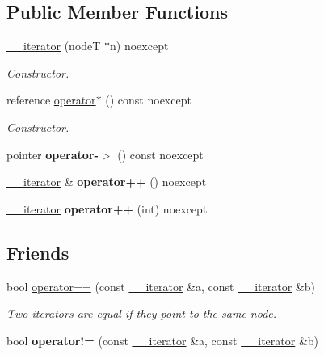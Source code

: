 \subsection*{Public Member Functions}
\begin{DoxyCompactItemize}
\item 
\hyperlink{class_a_putils_1_1____iterator_a80b798b8b6922e66337873c614c32aeb}{\+\_\+\+\_\+iterator} (nodeT $\ast$n) noexcept
\begin{DoxyCompactList}\small\item\em Constructor. \end{DoxyCompactList}\item 
reference \hyperlink{class_a_putils_1_1____iterator_a938d91cde92652266ae812ce9334b603}{operator$\ast$} () const noexcept
\begin{DoxyCompactList}\small\item\em Constructor. \end{DoxyCompactList}\item 
\mbox{\label{class_a_putils_1_1____iterator_a500d853bed90e2ad2db45c785558902c}} 
pointer {\bfseries operator-\/$>$} () const noexcept
\item 
\mbox{\label{class_a_putils_1_1____iterator_a4ef645ac13ab5ce5081462a4de4757e3}} 
\hyperlink{class_a_putils_1_1____iterator}{\+\_\+\+\_\+iterator} \& {\bfseries operator++} () noexcept
\item 
\mbox{\label{class_a_putils_1_1____iterator_aa20ee3ddb367bf371bf2bfb40de5e5f2}} 
\hyperlink{class_a_putils_1_1____iterator}{\+\_\+\+\_\+iterator} {\bfseries operator++} (int) noexcept
\end{DoxyCompactItemize}
\subsection*{Friends}
\begin{DoxyCompactItemize}
\item 
\mbox{\label{class_a_putils_1_1____iterator_a2e5014cb825532053115734598e16318}} 
bool \hyperlink{class_a_putils_1_1____iterator_a2e5014cb825532053115734598e16318}{operator==} (const \hyperlink{class_a_putils_1_1____iterator}{\+\_\+\+\_\+iterator} \&a, const \hyperlink{class_a_putils_1_1____iterator}{\+\_\+\+\_\+iterator} \&b)
\begin{DoxyCompactList}\small\item\em Two iterators are equal if they point to the same node. \end{DoxyCompactList}\item 
\mbox{\label{class_a_putils_1_1____iterator_add0144e7693bde5e4b509b5fd8dc5c96}} 
bool {\bfseries operator!=} (const \hyperlink{class_a_putils_1_1____iterator}{\+\_\+\+\_\+iterator} \&a, const \hyperlink{class_a_putils_1_1____iterator}{\+\_\+\+\_\+iterator} \&b)
\end{DoxyCompactItemize}


